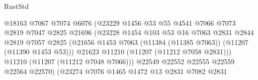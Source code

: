 \begin{lexlean}{RustStd}
\begin{coremodule}
                                          @18163
                                          @7067
                                          @7074
                                          @6076
                                          (@23229
                                            @1456
                                            @53
                                            @55
                                            @4541
                                            @7066
                                            @7073
                                            @2819
                                            @7047
                                            @2825
                                            @21696
                                            (@23228
                                              @1454
                                              @103
                                              @53
                                              @16
                                              @7063
                                              @2831
                                              @2844
                                              @2819
                                              @7057
                                              @2825
                                              (@21656
                                                @1453
                                                @7063
                                                (@11384 (@11385 @7063))
                                                (@11207 (@11390 @1453 @53)))
                                              @21623
                                              @11210
                                              (@11207 (@11212 @7058 @2831)))
                                            @11210
                                            (@11207 (@11212 @7048 @7066)))
                                          @22549
                                          @22552
                                          @22555
                                          @22559
                                          @22564
                                          @22570)
                                        (@23274
                                          @7076
                                          @1465
                                          @1472
                                          @13
                                          @2831
                                          @7082
                                          @2831

\end{coremodule}
\end{lexlean}
